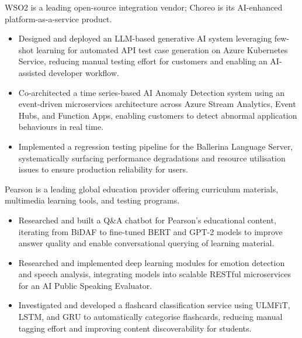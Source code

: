\documentclass[12pt,a4paper,withhyper]{altacv}
\begin{document}
WSO2 is a leading open-source integration vendor; Choreo is its AI-enhanced platform-as-a-service product.
\medskip
\begin{itemize} 

    \item Designed and deployed an LLM-based generative AI system leveraging few-shot learning for automated API test case generation on Azure Kubernetes Service, reducing manual testing effort for customers and enabling an AI-assisted developer workflow.

    \item Co-architected a time series-based AI Anomaly Detection system using an event-driven microservices architecture across Azure Stream Analytics, Event Hubs, and Function Apps, enabling customers to detect abnormal application behaviours in real time.

    \item Implemented a regression testing pipeline for the Ballerina Language Server, systematically surfacing performance degradations and resource utilisation issues to ensure production reliability for users.

\end{itemize}


Pearson is a leading global education provider offering curriculum materials, multimedia learning tools, and testing programs.
\medskip
\begin{itemize}
    \item Researched and built a Q\&A chatbot for Pearson's educational content, iterating from BiDAF to fine-tuned BERT and GPT-2 models to improve answer quality and enable conversational querying of learning material.

    \item Researched and implemented deep learning modules for emotion detection and speech analysis, integrating models into scalable RESTful microservices for an AI Public Speaking Evaluator.

    \item Investigated and developed a flashcard classification service using ULMFiT, LSTM, and GRU to automatically categorise flashcards, reducing manual tagging effort and improving content discoverability for students.


\end{itemize}
\end{document}
